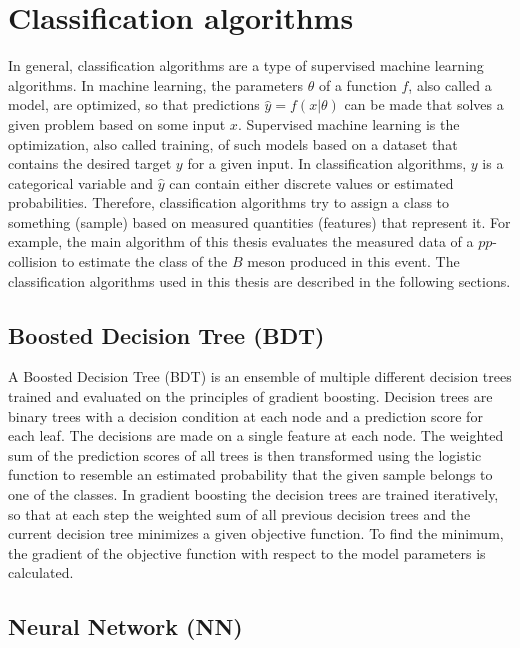 \section{Classification algorithms} %

In general, classification algorithms are a type of supervised machine learning algorithms.
In machine learning, the parameters $\theta$ of a function $f$, also called a model, are optimized, so that predictions $\hat{y}=f(x|\theta)$ can be made that solves a given problem based on some input $x$.
Supervised machine learning is the optimization, also called training, of such models based on a dataset that contains the desired target $y$ for a given input. 
In classification algorithms, $y$ is a categorical variable and $\hat{y}$ can contain either discrete values or estimated probabilities. 
Therefore, classification algorithms try to assign a class to something (sample) based on measured quantities (features) that represent it. %
For example, the main algorithm of this thesis evaluates the measured data of a $pp$-collision to estimate the class of the $B$ meson produced in this event.
The classification algorithms used in this thesis are described in the following sections.

\subsection{Boosted Decision Tree (BDT)}
\label{sec:BDT}

A Boosted Decision Tree (BDT) is an ensemble of multiple different decision trees trained and evaluated on the principles of gradient boosting.
Decision trees are binary trees with a decision condition at each node and a prediction score for each leaf.
The decisions are made on a single feature at each node.
The weighted sum of the prediction scores of all trees is then transformed using the logistic function to resemble an estimated probability that the given sample belongs to one of the classes.
In gradient boosting the decision trees are trained iteratively, so that at each step the weighted sum of all previous decision trees and the current decision tree minimizes a given objective function.
To find the minimum, the gradient of the objective function with respect to the model parameters is calculated.

\subsection{Neural Network (NN)}
\label{sec:NN}

